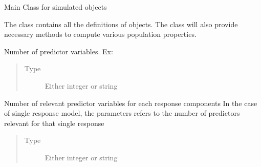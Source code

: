 \documentclass[letterpaper,10pt,english]{sphinxmanual}
\begin{document}
\begin{fulllineitems}
\label{\detokenize{Classes:pysimrel.Simrel}}
Main Class for simulated objects

The class contains all the definitions of  objects. The class will also
provide necessary methods to compute various population properties.

\begin{fulllineitems}
\label{\detokenize{Classes:pysimrel.Simrel.n_pred}}
Number of predictor variables. Ex: 
\begin{quote}\begin{description}
\item[{Type}] \leavevmode
Either integer or string

\end{description}\end{quote}

\end{fulllineitems}


\begin{fulllineitems}
\label{\detokenize{Classes:pysimrel.Simrel.n_relpred}}
Number of relevant predictor variables for each response components
In the case of single response model, the parameters refers to the
number of predictors relevant for that single response
\begin{quote}\begin{description}
\item[{Type}] \leavevmode
Either integer or string


\end{description}
\end{quote}
\end{fulllineitems}
\end{fulllineitems}
\end{document}
